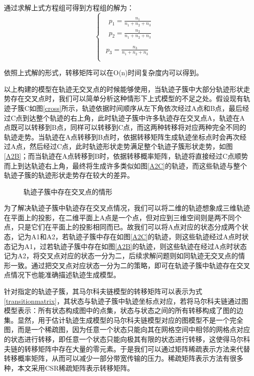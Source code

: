 通过求解上式方程组可得到方程组的解为：
\[
\begin{cases}
\begin{array}{c}
	\begin{array}{c}
	p_1=\frac{n_1}{n_1+n_2+n_3}\\
	p_2=\frac{n_2}{n_1+n_2+n_3}\\
\end{array}\\
	p_3=\frac{n_3}{n_1+n_2+n_3}\\
\end{array}    
\end{cases}
\]

依照上式解的形式，转移矩阵可以在O(n)时间复杂度内可以得到。

以上构建的模型在轨迹无交叉点的时候能够使用，当轨迹子簇中大部分轨迹形状走势存在交叉点时，我们可以简单分析这种情形下上式模型的不足之处。假设现有轨迹子簇C如图\ref{cross}所示，轨迹依据时间顺序从左下角依次经过A点和B点，最后经过C点到达整个轨迹的右上角，此时轨迹子簇中许多轨迹存在交叉点A，轨迹在A点既可以转移到B点，同样可以转移到C点，而这两种转移将对应两种完全不同的轨迹走势。当轨迹在A点转移到B点时，依据转移矩阵生成轨迹坐标点时会再次经过A点，然后经过C点，此时轨迹形状走势满足整个轨迹子簇形状走势，如图\ref{A2B}；而当轨迹在A点转移到B时，依据转移概率矩阵，轨迹将直接经过C点顺势而上到达轨迹右上角，最终将生成许多类似如图\ref{A2C}的轨迹，而这些轨迹与整个轨迹子簇的轨迹形状走势存在较大的差异。
\begin{figure}[h]
\caption{轨迹子簇中存在交叉点的情形}
\label{crosssituation}
\end{figure}

为了解决轨迹子簇中轨迹存在交叉点情况，我们可以将二维的轨迹想象成三维轨迹在平面上的投影，在二维平面上A点是一个点，但对应到三维空间则是两不同个点，只是它们在平面上的投影相同而已。故我们可以将A点对应的状态分成两个状态，记为A1和A2，若轨迹子簇中存在如图\ref{A2C}的轨迹，则这些轨迹经过A点时状态记为A1，过若轨迹子簇中存在如图\ref{A2B}的轨迹，则这些轨迹在经过A点时状态记为A2，将交叉点对应的状态一分为二，后续求解问题则如同轨迹无交叉点的情形一致。通过把交叉点对应状态一分为二的策略，即可在轨迹子簇中轨迹存在交叉点情况下也能准确描述轨迹生成模型。

针对指定的轨迹子簇，其马尔科夫链模型的转移矩阵可以表示为式\ref{transitionmatrix}，其状态与轨迹子簇中轨迹坐标点对应，若将马尔科夫链通过图模型表示：所有状态构成图中的点集，状态与状态之间的所有转移构成了图的边集。显然，用于估计轨迹生成模型的马尔科夫链模型对应的图模型不是一个完全图，而是一个稀疏图，因为任意一个状态只能向其在网格空间中相邻的网格点对应的状态进行转移，即任意一个状态只能向极其有限的状态进行转移，这使得马尔科夫链的转移矩阵中存在大量的零元素。于是我们可以通过矩阵稀疏表示方法来代替转移概率矩阵，从而可以减少一部分带宽传输的压力。稀疏矩阵表示方法有很多种，本文采用CSR稀疏矩阵表示转移矩阵。

